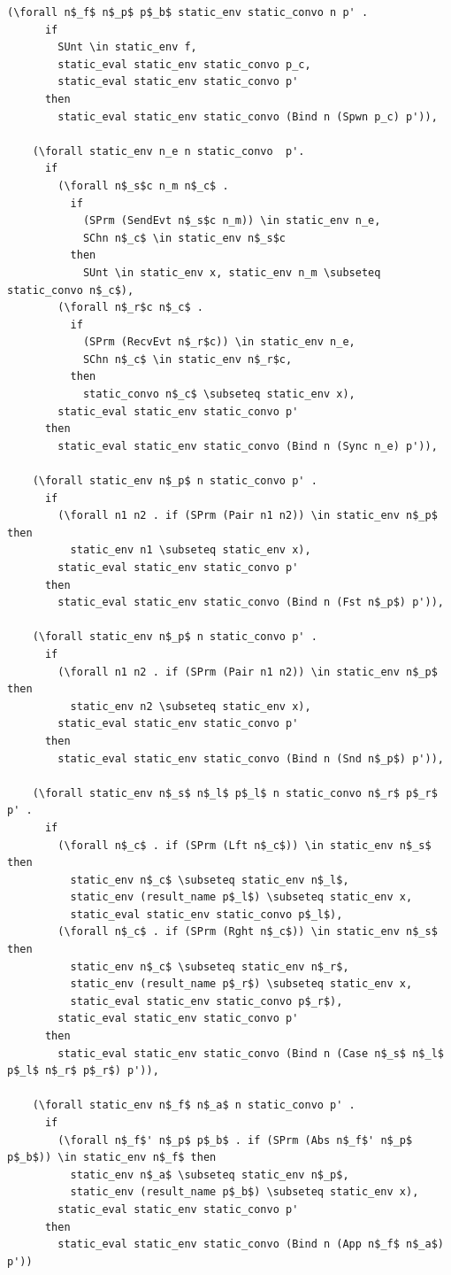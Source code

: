 \documentclass[10pt]{article}
\begin{document}
\begin{lstlisting}[language=logic, mathescape]
    (\forall n$_f$ n$_p$ p$_b$ static_env static_convo n p' .
      if
        SUnt \in static_env f, 
        static_eval static_env static_convo p_c, 
        static_eval static_env static_convo p'
      then
        static_eval static_env static_convo (Bind n (Spwn p_c) p')),

    (\forall static_env n_e n static_convo  p'.
      if
        (\forall n$_s$c n_m n$_c$ . 
          if
            (SPrm (SendEvt n$_s$c n_m)) \in static_env n_e, 
            SChn n$_c$ \in static_env n$_s$c 
          then
            SUnt \in static_env x, static_env n_m \subseteq static_convo n$_c$),
        (\forall n$_r$c n$_c$ . 
          if
            (SPrm (RecvEvt n$_r$c)) \in static_env n_e,
            SChn n$_c$ \in static_env n$_r$c, 
          then
            static_convo n$_c$ \subseteq static_env x),
        static_eval static_env static_convo p'
      then
        static_eval static_env static_convo (Bind n (Sync n_e) p')),

    (\forall static_env n$_p$ n static_convo p' . 
      if
        (\forall n1 n2 . if (SPrm (Pair n1 n2)) \in static_env n$_p$ then
          static_env n1 \subseteq static_env x),
        static_eval static_env static_convo p'
      then
        static_eval static_env static_convo (Bind n (Fst n$_p$) p')),

    (\forall static_env n$_p$ n static_convo p' . 
      if
        (\forall n1 n2 . if (SPrm (Pair n1 n2)) \in static_env n$_p$ then
          static_env n2 \subseteq static_env x),
        static_eval static_env static_convo p'
      then
        static_eval static_env static_convo (Bind n (Snd n$_p$) p')),

    (\forall static_env n$_s$ n$_l$ p$_l$ n static_convo n$_r$ p$_r$ p' . 
      if
        (\forall n$_c$ . if (SPrm (Lft n$_c$)) \in static_env n$_s$ then 
          static_env n$_c$ \subseteq static_env n$_l$,
          static_env (result_name p$_l$) \subseteq static_env x,
          static_eval static_env static_convo p$_l$),
        (\forall n$_c$ . if (SPrm (Rght n$_c$)) \in static_env n$_s$ then 
          static_env n$_c$ \subseteq static_env n$_r$, 
          static_env (result_name p$_r$) \subseteq static_env x, 
          static_eval static_env static_convo p$_r$),
        static_eval static_env static_convo p'
      then
        static_eval static_env static_convo (Bind n (Case n$_s$ n$_l$ p$_l$ n$_r$ p$_r$) p')),

    (\forall static_env n$_f$ n$_a$ n static_convo p' . 
      if
        (\forall n$_f$' n$_p$ p$_b$ . if (SPrm (Abs n$_f$' n$_p$ p$_b$)) \in static_env n$_f$ then 
          static_env n$_a$ \subseteq static_env n$_p$, 
          static_env (result_name p$_b$) \subseteq static_env x),
        static_eval static_env static_convo p'
      then
        static_eval static_env static_convo (Bind n (App n$_f$ n$_a$) p'))
  \end{lstlisting}
\end{document}
